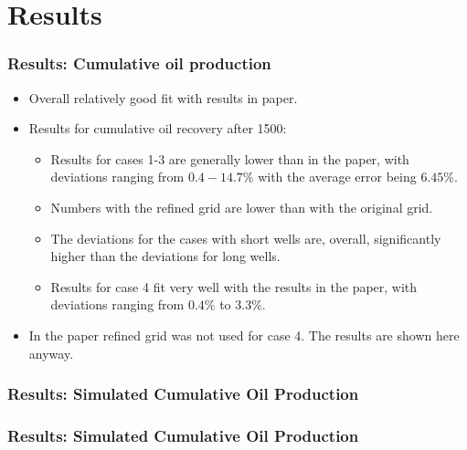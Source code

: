 \section{Results}

\begin{frame}
    \frametitle{Results: Cumulative oil production}
    \begin{itemize}
        \item Overall relatively good fit with results in paper.
        \item Results for cumulative oil recovery after 1500:
        \begin{itemize}
             \item Results for cases 1-3 are generally lower than in the paper, with deviations ranging from $0.4-14.7\%$ with the average error being $6.45\%$. 
             \item Numbers with the refined grid are lower than with the original grid. 
             \item The deviations for the cases with short wells are, overall, significantly higher than the deviations for long wells.
             \item Results for case 4 fit very well with the results in the paper, with deviations ranging from $0.4\%$ to $3.3\%$.
         \end{itemize} 
         \item In the paper refined grid was not used for case 4. The results are shown here anyway.
    \end{itemize}
\end{frame}


\begin{frame}
    \frametitle{Results: Simulated Cumulative Oil Production}
    \footnotesize
    \centerline{}
\end{frame}


\begin{frame}
    \frametitle{Results: Simulated Cumulative Oil Production}
    \footnotesize
    \centerline{}
\end{frame}


